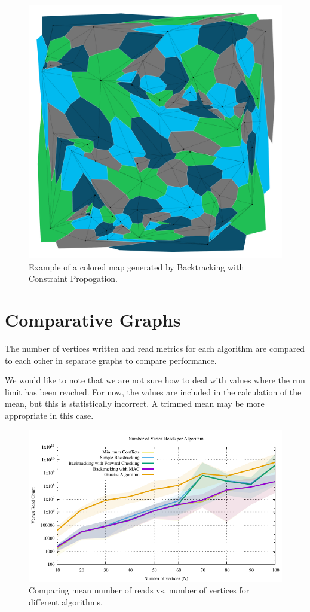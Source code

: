 \documentclass{article}
\begin{document}
\begin{multicols}{2}
\begin{figure}[H]
	\centering
	\includegraphics[width=\linewidth]{../results/backtracking_mac/maps/bt_mac_N80_k4_I6}
	\caption{Example of a colored map generated by Backtracking with Constraint Propogation.}
\end{figure}

\section{Comparative Graphs}
The number of vertices written and read metrics for each algorithm are compared to each other in separate graphs to compare performance. \par We would like to note that we are not sure how to deal with values where the run limit has been reached. For now, the values are included in the calculation of the mean, but this is statistically incorrect. A trimmed mean may be more appropriate in this case.
\begin{figure}[H]
	\centering
	\includegraphics[width=\linewidth]{../results/comparing_read_performance}
	\caption{Comparing mean number of reads vs. number of vertices for different algorithms.}
\end{figure}


\end{multicols}
\end{document}
